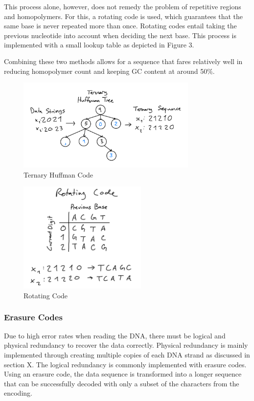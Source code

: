 \documentclass[a4paper,conference]{IEEEtran}
\begin{document}
This process alone, however, does not remedy the problem of repetitive regions and homopolymers. For this, a rotating code is used, which guarantees that the same base is never repeated more than once. Rotating codes entail taking the previous nucleotide into account when deciding the next base. This process is implemented with a small lookup table as depicted in Figure 3.

Combining these two methods allows for a sequence that fares relatively well in reducing homopolymer count and keeping GC content at around 50\%.

\begin{figure}
\centering
\includegraphics[width=3.5in]{huffman}
\caption{Ternary Huffman Code}
\label{code}
\end{figure}
\begin{figure}
\centering
\includegraphics[width=2.5in]{rotatingcode}
\caption{Rotating Code}
\label{code}
\end{figure}

\subsubsection{Erasure Codes}
Due to high error rates when reading the DNA, there must be logical and physical redundancy to recover the data correctly. Physical redundancy is mainly implemented through creating multiple copies of each DNA strand as discussed in section X. The logical redundancy is commonly \cite{} implemented with erasure codes. Using an erasure code, the data sequence is transformed into a longer sequence that can be successfully decoded with only a subset of the characters from the encoding.
\end{document}
